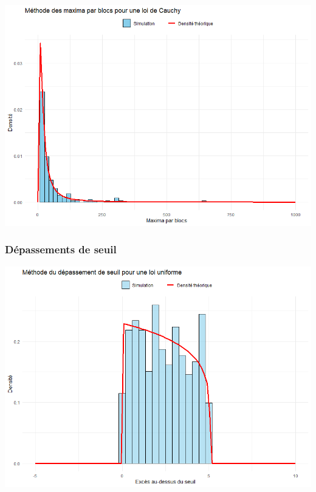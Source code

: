 \documentclass{article}
\theoremstyle{plain}
\theoremstyle{definition}
\theoremstyle{plain}
\begin{document}
\begin{center}
	\includegraphics[scale=0.70]{./images/MB_Cauchy} 
\end{center}

\subsubsection{Dépassements de seuil}

\begin{center}
	\includegraphics[scale=0.70]{./images/DS_Uniforme} 
\end{center}
\end{document}
